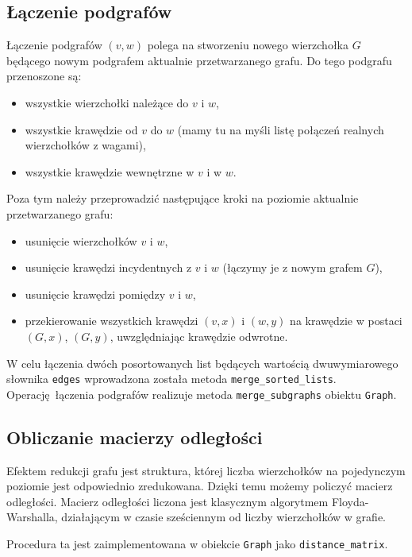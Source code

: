 \documentclass[a4paper,10pt]{article}
\begin{document}
\subsection{Łączenie podgrafów}

Łączenie podgrafów $(v, w)$ polega na stworzeniu nowego wierzchołka $G$ będącego nowym podgrafem aktualnie przetwarzanego grafu. Do tego podgrafu przenoszone są:
\begin{itemize}
 \item wszystkie wierzchołki należące do $v$ i $w$,
 \item wszystkie krawędzie od $v$ do $w$ (mamy tu na myśli listę połączeń realnych wierzchołków z wagami),
 \item wszystkie krawędzie wewnętrzne w $v$ i w $w$.
\end{itemize}

Poza tym należy przeprowadzić następujące kroki na poziomie aktualnie przetwarzanego grafu:

\begin{itemize}
 \item usunięcie wierzchołków $v$ i $w$,
 \item usunięcie krawędzi incydentnych z $v$ i $w$ (łączymy je z nowym grafem $G$),
 \item usunięcie krawędzi pomiędzy $v$ i $w$,
 \item przekierowanie wszystkich krawędzi $\left(v, x\right)$ i $\left(w, y\right)$ na krawędzie w postaci $\left(G, x\right)$, $\left(G, y\right)$, uwzględniając krawędzie odwrotne.
\end{itemize}

W celu łączenia dwóch posortowanych list będących wartością dwuwymiarowego słownika \texttt{edges} wprowadzona została metoda \texttt{merge\_sorted\_lists}. Operację łączenia podgrafów realizuje metoda \texttt{merge\_subgraphs} obiektu \texttt{Graph}.

\subsection{Obliczanie macierzy odległości}

Efektem redukcji grafu jest struktura, której liczba wierzchołków na pojedynczym poziomie jest odpowiednio zredukowana. Dzięki temu możemy policzyć macierz odległości. Macierz odległości liczona jest klasycznym algorytmem Floyda-Warshalla, działającym w czasie sześciennym od liczby wierzchołków w grafie.

Procedura ta jest zaimplementowana w obiekcie \texttt{Graph} jako \texttt{distance\_matrix}.
\end{document}
